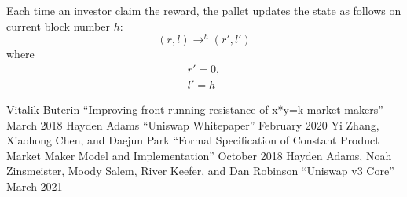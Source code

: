 \documentclass[twoside,twocolumn]{article}
\begin{document}
Each time an investor claim the reward,
the pallet updates the state as follows on current block number $h$:
\[
    (r,l)\mathop{\to}^{h}(r',l')
\]
where
\begin{align*}
    r' = 0, \\
    l' = h
\end{align*}





\begin{thebibliography}{99} %

     Vitalik Buterin
    ``Improving front running resistance of x*y=k market makers''
    March 2018
     Hayden Adams
    ``Uniswap Whitepaper''
    February 2020
     Yi Zhang, Xiaohong Chen, and Daejun Park
    ``Formal Specification of Constant Product Market Maker Model and Implementation''
    October 2018
     Hayden Adams, Noah Zinsmeister, Moody Salem,
    River Keefer, and Dan Robinson
    ``Uniswap v3 Core''
    March 2021

\end{thebibliography}

\end{document}

